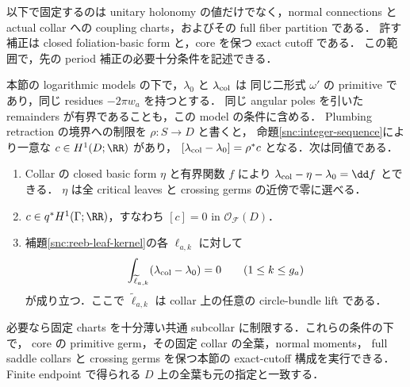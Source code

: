 以下で固定するのは unitary holonomy の値だけでなく，normal connections と
actual collar への coupling charts，およびその full fiber partition である．
許す補正は closed foliation-basic form と，core を保つ exact cutoff である．
この範囲で，先の period 補正の必要十分条件を記述できる．

\begin{proposition}
\label{snc:fixed-holonomy}
本節の logarithmic models の下で，$\lambda_0$ と $\lambda_{\rm col}$ は
同じ二形式 $\omega'$ の primitive であり，同じ residues $-2\pi w_a$ を持つとする．
同じ angular poles を引いた remainders が有界であることも，この model の条件に含める．
Plumbing retraction の境界への制限を $\rho:S\to D$ と書くと，
命題\ref{snc:integer-sequence}により一意な $c\in H^1(D;\RR)$ があり，
$[\lambda_{\rm col}-\lambda_0]=\rho^*c$ となる．次は同値である．
\begin{enumerate}
\item Collar の closed basic form $\eta$ と有界関数 $f$ により
  $\lambda_{\rm col}-\eta-\lambda_0=\dd f$ とできる．
  $\eta$ は全 critical leaves と crossing germs の近傍で零に選べる．
\item $c\in q^*H^1(\Gamma;\RR)$，すなわち $[c]=0$ in $\mathcal O_{\mathcal F}(D)$．
\item 補題\ref{snc:reeb-leaf-kernel}の各 $\ell_{a,k}$ に対して
  \begin{equation}\label{snc:fixed-leaf-period-test}
   \int_{\widetilde\ell_{a,k}}(\lambda_{\rm col}-\lambda_0)=0
   \qquad(1\le k\le g_a)
  \end{equation}
  が成り立つ．ここで $\widetilde\ell_{a,k}$ は collar 上の任意の circle-bundle lift である．
\end{enumerate}
必要なら固定 charts を十分薄い共通 subcollar に制限する．これらの条件の下で，
core の primitive germ，その固定 collar の全葉，normal moments，
full saddle collars と crossing germs を保つ本節の exact-cutoff 構成を実行できる．
Finite endpoint で得られる $D$ 上の全葉も元の指定と一致する．
\end{proposition}

